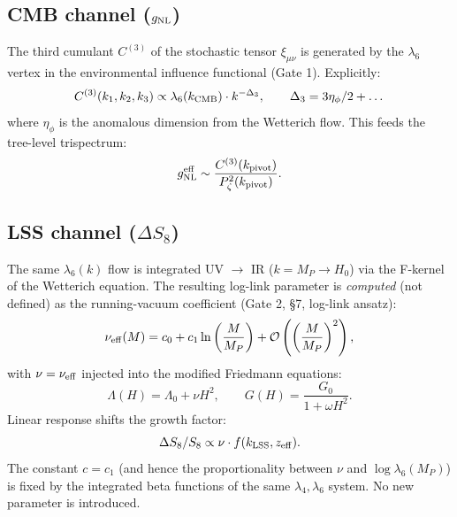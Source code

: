 \documentclass[11pt,a4paper]{article}
\begin{document}
\subsection{CMB channel (\(g_{\rm NL}\))}
The third cumulant \(C^{(3)}\) of the stochastic tensor \(\xi_{\mu\nu}\) is generated by the \(\lambda_6\) vertex in the environmental influence functional (Gate 1). Explicitly:
\begin{equation}
C^{(3)}(k_1,k_2,k_3) \propto \lambda_{6}(k_{\rm CMB}) \cdot k^{-\Delta_3}, \qquad \Delta_3 = 3\eta_\phi/2 + \dots
\end{equation}
where \(\eta_\phi\) is the anomalous dimension from the Wetterich flow. This feeds the tree-level trispectrum:
\begin{equation}
g_{\rm NL}^{\rm eff} \sim \frac{C^{(3)}(k_{\rm pivot})}{P_\zeta^2(k_{\rm pivot})}.
\end{equation}

\subsection{LSS channel (\(\Delta S_8\))}
The same \(\lambda_6(k)\) flow is integrated UV \(\to\) IR (\(k = M_P \to H_0\)) via the F-kernel of the Wetterich equation. The resulting log-link parameter is \emph{computed} (not defined) as the running-vacuum coefficient (Gate 2, \S7, log-link ansatz):
\begin{equation}
\nu_{\rm eff}(M) = c_0 + c_1 \ln\left(\frac{M}{M_P}\right) + \mathcal{O}\left(\left(\frac{M}{M_P}\right)^2\right),
\end{equation}
with \(\nu = \nu_{\rm eff}\) injected into the modified Friedmann equations:
\begin{equation}
\Lambda(H) = \Lambda_0 + \nu H^2, \qquad G(H) = \frac{G_0}{1 + \omega H^2}.
\end{equation}
Linear response shifts the growth factor:
\begin{equation}
\Delta S_8 / S_8 \propto \nu \cdot f(k_{\rm LSS}, z_{\rm eff}).
\end{equation}
The constant \(c = c_1\) (and hence the proportionality between \(\nu\) and \(\log\lambda_6(M_P)\)) is fixed by the integrated beta functions of the same \(\lambda_4,\lambda_6\) system. No new parameter is introduced.
\end{document}

